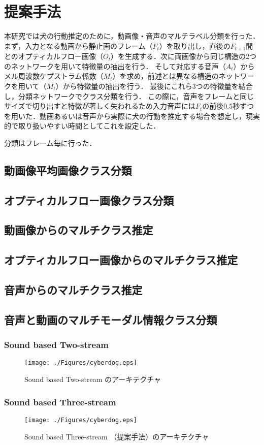 \chapter{提案手法}
本研究では犬の行動推定のために，動画像・音声のマルチラベル分類を行った．
まず，入力となる動画から静止画のフレーム（$F_t$）を取り出し，直後の$F_{t+1}$間とのオプティカルフロー画像（$O_t$）を生成する．次に両画像から同じ構造の2つのネットワークを用いて特徴量の抽出を行う．
そして対応する音声（$A_t$）からメル周波数ケプストラム係数（$M_t$）を求め，前述とは異なる構造のネットワークを用いて（$M_t$）から特徴量の抽出を行う．
最後にこれら3つの特徴量を結合し，分類ネットワークでクラス分類を行う．
この際に，音声をフレームと同じサイズで切り出すと特徴が著しく失われるため入力音声には$F_t$の前後0.5秒ずつを用いた．動画あるいは音声から実際に犬の行動を推定する場合を想定し，現実的で取り扱いやすい時間としてこれを設定した．

分類はフレーム毎に行った．
\section{動画像平均画像クラス分類}
\section{オプティカルフロー画像クラス分類}
\section{動画像からのマルチクラス推定}
\section{オプティカルフロー画像からのマルチクラス推定}
\section{音声からのマルチクラス推定}
\section{音声と動画のマルチモーダル情報クラス分類}
\subsection{Sound based Two-stream}
\begin{figure}[htbp]
 \begin{center}
  \texttt{[image: ./Figures/cyberdog.eps]}
  \caption{Sound based Two-stream のアーキテクチャ}
  \label{sound-three-stream}
 \end{center}
\end{figure}
\subsection{Sound based Three-stream}
\begin{figure}[htbp]
 \begin{center}
  \texttt{[image: ./Figures/cyberdog.eps]}
  \caption{Sound based Three-stream （提案手法）のアーキテクチャ}
  \label{sound-three-stream}
 \end{center}
\end{figure}
